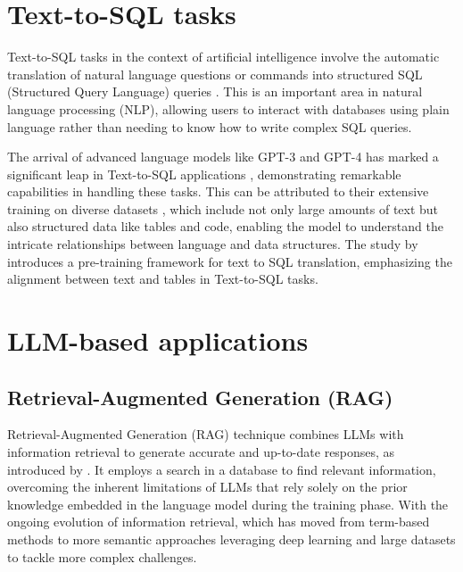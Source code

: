     \section{Text-to-SQL tasks} 

        Text-to-SQL tasks in the context of artificial intelligence involve the automatic translation of natural language questions or commands into structured SQL (Structured Query Language) queries \citep{Qin2022}. 
        This is an important area in natural language processing (NLP), allowing users to interact with databases using plain language rather than needing to know how to write complex SQL queries.         
        
        The arrival of advanced language models like GPT-3 and GPT-4 \citep{OpenAImodels} has marked a significant leap in Text-to-SQL applications \citep{Singh2023}, demonstrating remarkable capabilities in handling these tasks. 
        This can be attributed to their extensive training on diverse datasets \citep{Deng2021}, which include not only large amounts of text but also structured data like tables and code, enabling the model to understand the intricate relationships between language and data structures. 
        The study by \citep{Deng2023} introduces a pre-training framework for text to SQL translation, emphasizing the alignment between text and tables in Text-to-SQL tasks.


    \section{LLM-based applications}


        \subsection{Retrieval-Augmented Generation (RAG)} 

            Retrieval-Augmented Generation (RAG) technique combines LLMs with information retrieval to generate accurate and up-to-date responses, as introduced by \citet{Lewis2020}. 
            It employs a search in a database to find relevant information, overcoming the inherent limitations of LLMs that rely solely on the prior knowledge embedded in the language model during the training phase. 
            With the ongoing evolution of information retrieval, which has moved from term-based methods to more semantic approaches leveraging deep learning and large datasets to tackle more complex challenges.
            
